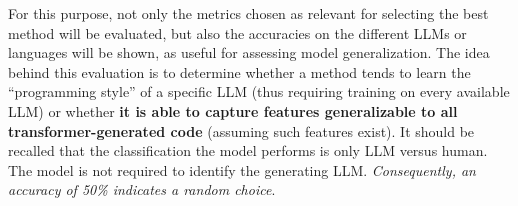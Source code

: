 For this purpose, not only the metrics chosen as relevant for selecting the 
best method will be evaluated, but also the accuracies on the different LLMs 
or languages will be shown, as useful for assessing model generalization. 
The idea behind this evaluation is to determine whether a method tends to 
learn the “programming style” of a specific LLM (thus requiring training 
on every available LLM) or whether \textbf{it is able to capture features 
generalizable to all transformer-generated code} (assuming such 
features exist).
It should be recalled that the classification the 
model performs is only LLM versus human. The model is 
not required to identify the generating LLM. \textit{Consequently, 
an accuracy of 50\% indicates a random choice}.





